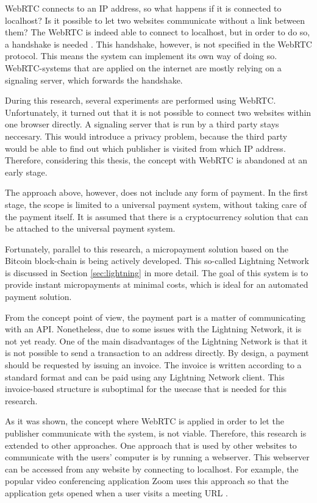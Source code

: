 WebRTC connects to an IP address, so what happens if it is connected to localhost? Is it possible to let two websites communicate without a link between them? The WebRTC is indeed able to connect to localhost, but in order to do so, a handshake is needed \cite{dutton2013webrtc}. This handshake, however, is not specified in the WebRTC protocol. This means the system can implement its own way of doing so. WebRTC-systems that are applied on the internet are mostly relying on a signaling server, which forwards the handshake. 

During this research, several experiments are performed using WebRTC. Unfortunately, it turned out that it is not possible to connect two websites within one browser directly. A signaling server that is run by a third party stays neccesary. This would introduce a privacy problem, because the third party would be able to find out which publisher is visited from which IP address. Therefore, considering this thesis, the concept with WebRTC is abandoned at an early stage.

The approach above, however, does not include any form of payment. In the first stage, the scope is limited to a universal payment system, without taking care of the payment itself. It is assumed that there is a cryptocurrency solution that can be attached to the universal payment system.

Fortunately, parallel to this research, a micropayment solution based on the Bitcoin block-chain is being actively developed. This so-called Lightning Network is discussed in Section \ref{sec:lightning} in more detail. The goal of this system is to provide instant micropayments at minimal costs, which is ideal for an automated payment solution.

From the concept point of view, the payment part is a matter of communicating with an API. Nonetheless, due to some issues with the Lightning Network, it is not yet ready. One of the main disadvantages of the Lightning Network is that it is not possible to send a transaction to an address directly. By design, a payment should be requested by issuing an invoice. The invoice is written according to a standard format and can be paid using any Lightning Network client. This invoice-based structure is suboptimal for the usecase that is needed for this research.

As it was shown, the concept where WebRTC is applied in order to let the publisher communicate with the system, is not viable. Therefore, this research is extended to other approaches. One approach that is used by other websites to communicate with the users' computer is by running a webserver. This webserver can be accessed from any website by connecting to localhost. For example, the popular video conferencing application Zoom uses this approach so that the application gets opened when a user visits a meeting URL \cite{zoomwebserver}.

